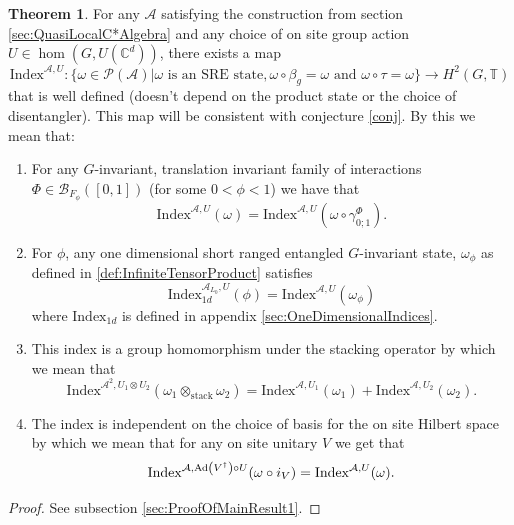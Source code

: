 \documentclass[12pt,a4paper,twoside]{article}
\let\originalleft\left
\let\originalright\right
\renewcommand{\left}{\mathopen{}\mathclose\bgroup\originalleft}
\renewcommand{\right}{\aftergroup\egroup\originalright}
\newcommand{\BB}{\mathcal B}
\newcommand{\PP}{\mathcal P}
\newcommand{\CC}{\mathbb C}
\newcommand{\TT}{\mathbb T}
\renewcommand{\AA}{\mathcal A}
\newcommand{\Ad}[1]{\textrm{Ad}\left(#1\right)}
\theoremstyle{definition}
\newtheorem{theorem}{Theorem}[section]
\numberwithin{equation}{section}
\begin{document}
\begin{theorem}\label{thrm:MainResult1}
	For any $\AA$ satisfying the construction from section \ref{sec:QuasiLocalC*Algebra} and any choice of on site group action $U\in\hom(G,U(\CC^d))$, there exists a map
	\begin{equation}
		\textrm{Index}^{\AA,U}:\{\omega\in\PP(\AA)|\omega\text{ is an SRE state},\omega\circ\beta_g=\omega\text{ and }\omega\circ\tau=\omega\}\rightarrow H^2(G,\TT)
	\end{equation}
	that is well defined (doesn't depend on the product state or the choice of disentangler). This map will be consistent with conjecture \ref{conj}. By this we mean that:
	\begin{enumerate}
		\item For any $G$-invariant, translation invariant family of interactions $\Phi\in\BB_{F_{\phi}}([0,1])$ (for some $0<\phi<1$) we have that
		\begin{equation}
			\textrm{Index}^{\AA,U}(\omega)=\textrm{Index}^{\AA,U}(\omega\circ\gamma^{\Phi}_{0;1}).
		\end{equation}
		\item For $\phi$, any one dimensional short ranged entangled $G$-invariant state, $\omega_\phi$ as defined in \ref{def:InfiniteTensorProduct} satisfies
		\begin{equation}
			\textrm{Index}^{\AA_{L_0},U}_{1d}(\phi)=\textrm{Index}^{\AA,U}(\omega_\phi)
		\end{equation}
		where $\textrm{Index}_{1d}$ is defined in appendix \ref{sec:OneDimensionalIndices}.
		\item This index is a group homomorphism under the stacking operator by which we mean that
		\begin{equation}
			\textrm{Index}^{\AA^2,U_1\otimes U_2}(\omega_1\otimes_{\text{stack}}\omega_2)=\textrm{Index}^{\AA,U_1}(\omega_1)+\textrm{Index}^{\AA,U_2}(\omega_2).
		\end{equation}
		\item The index is independent on the choice of basis for the on site Hilbert space by which we mean that for any on site unitary $V$ we get that
		\begin{equation}
			\textrm{Index}^{\AA,\Ad{V^\dagger}\circ U}(\omega\circ i_V)=\textrm{Index}^{\AA,U}(\omega).
		\end{equation}
	\end{enumerate}
\end{theorem}
\begin{proof}
	See subsection \ref{sec:ProofOfMainResult1}.
\end{proof}
\end{document}
